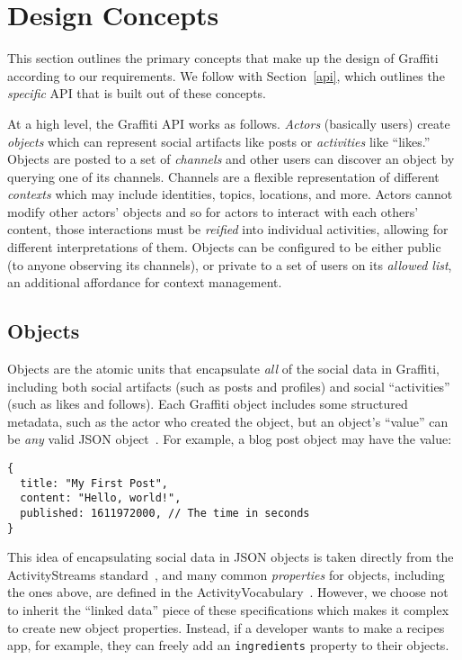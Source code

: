 \section{Design Concepts}
\label{concepts}

This section outlines the primary concepts that make up the design of Graffiti
according to our requirements.
We follow with Section~\ref{api}, which outlines the \emph{specific} API that is built out of these
concepts.

At a high level, the Graffiti API works as follows.
\emph{Actors} (basically users) create \emph{objects} which can represent
social artifacts like posts or \emph{activities} like ``likes.''
Objects are posted to a set of \emph{channels} and other users can
discover an object by querying one of its channels. Channels are a flexible representation
of different \emph{contexts} which may include identities, topics, locations,
and more.
Actors cannot modify other actors' objects and so for actors to interact with each others' content,
those interactions must be \emph{reified} into individual
activities,
allowing for different interpretations of them.
Objects can be configured to be either public
(to anyone observing its channels),
or private to a set of users on its \emph{allowed list},
an additional affordance for context management.

\subsection{Objects}
\label{concepts:objects}

Objects are the atomic units that encapsulate \emph{all}
of the social data in Graffiti, including
both social artifacts (such as posts and profiles) and social ``activities'' (such as likes and follows).
Each Graffiti object includes some structured metadata,
such as the actor who created the object,
but an object's ``value'' can be \emph{any} valid JSON object~\cite{json}.
For example, a blog post object may have the value:

\begin{verbatim}
{
  title: "My First Post",
  content: "Hello, world!",
  published: 1611972000, // The time in seconds
}
\end{verbatim}

This idea of encapsulating social data in JSON objects is
taken directly from the ActivityStreams standard~\cite{activitystreams},
and many common \emph{properties} for objects,
including the ones above, are defined in the
ActivityVocabulary~\cite{activityvocab}.
However, we choose not to inherit the ``linked data'' piece
of these specifications which makes it complex to create new object properties.
Instead, if a developer wants to make a recipes app, for example,
they can freely add an \texttt{ingredients} property to their objects.

